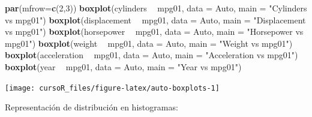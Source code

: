 \documentclass[]{book}
\newenvironment{Shaded}{\begin{snugshade}}{\end{snugshade}}
\newcommand{\KeywordTok}[1]{\textcolor[rgb]{0.13,0.29,0.53}{\textbf{#1}}}
\newcommand{\DataTypeTok}[1]{\textcolor[rgb]{0.13,0.29,0.53}{#1}}
\newcommand{\DecValTok}[1]{\textcolor[rgb]{0.00,0.00,0.81}{#1}}
\newcommand{\StringTok}[1]{\textcolor[rgb]{0.31,0.60,0.02}{#1}}
\newcommand{\OperatorTok}[1]{\textcolor[rgb]{0.81,0.36,0.00}{\textbf{#1}}}
\newcommand{\NormalTok}[1]{#1}
\begin{document}
\begin{Shaded}
\begin{Highlighting}[]
\KeywordTok{par}\NormalTok{(}\DataTypeTok{mfrow=}\KeywordTok{c}\NormalTok{(}\DecValTok{2}\NormalTok{,}\DecValTok{3}\NormalTok{))}
\KeywordTok{boxplot}\NormalTok{(cylinders }\OperatorTok{~}\StringTok{ }\NormalTok{mpg01, }\DataTypeTok{data =}\NormalTok{ Auto, }\DataTypeTok{main =} \StringTok{"Cylinders vs mpg01"}\NormalTok{)}
\KeywordTok{boxplot}\NormalTok{(displacement }\OperatorTok{~}\StringTok{ }\NormalTok{mpg01, }\DataTypeTok{data =}\NormalTok{ Auto, }\DataTypeTok{main =} \StringTok{"Displacement vs mpg01"}\NormalTok{)}
\KeywordTok{boxplot}\NormalTok{(horsepower }\OperatorTok{~}\StringTok{ }\NormalTok{mpg01, }\DataTypeTok{data =}\NormalTok{ Auto, }\DataTypeTok{main =} \StringTok{"Horsepower vs mpg01"}\NormalTok{)}
\KeywordTok{boxplot}\NormalTok{(weight }\OperatorTok{~}\StringTok{ }\NormalTok{mpg01, }\DataTypeTok{data =}\NormalTok{ Auto, }\DataTypeTok{main =} \StringTok{"Weight vs mpg01"}\NormalTok{)}
\KeywordTok{boxplot}\NormalTok{(acceleration }\OperatorTok{~}\StringTok{ }\NormalTok{mpg01, }\DataTypeTok{data =}\NormalTok{ Auto, }\DataTypeTok{main =} \StringTok{"Acceleration vs mpg01"}\NormalTok{)}
\KeywordTok{boxplot}\NormalTok{(year }\OperatorTok{~}\StringTok{ }\NormalTok{mpg01, }\DataTypeTok{data =}\NormalTok{ Auto, }\DataTypeTok{main =} \StringTok{"Year vs mpg01"}\NormalTok{)}
\end{Highlighting}
\end{Shaded}

\begin{center}\texttt{[image: cursoR\_files/figure-latex/auto-boxplots-1]} \end{center}

Representación de distribución en histogramas:
\end{document}
